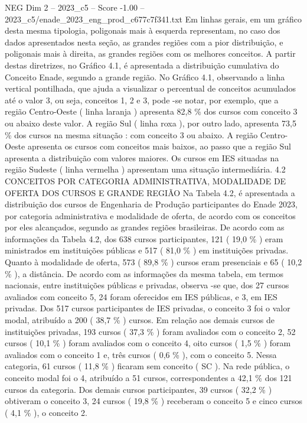 \begin{textsample}{NEG Dim 2 – 2023\_c5 – Score -1.00 – 2023\_c5/enade\_2023\_eng\_prod\_c677c7f341.txt}
Em linhas gerais, em um gráfico desta mesma tipologia, poligonais mais à esquerda representam, no caso dos dados apresentados nesta seção, as grandes regiões com a pior distribuição, e poligonais mais à direita, as grandes regiões com os melhores conceitos.
A partir destas diretrizes, no Gráfico 4.1, é apresentada a distribuição cumulativa do Conceito Enade, segundo a grande região.
No Gráfico 4.1, observando a linha vertical pontilhada, que ajuda a visualizar o percentual de conceitos acumulados até o valor 3, ou seja, conceitos 1, 2 e 3, pode -se notar, por exemplo, que a região Centro-Oeste ( linha laranja ) apresenta 82,8 \% dos cursos com conceito 3 ou abaixo deste valor.
A região Sul ( linha roxa ), por outro lado, apresenta 73,5 \% dos cursos na mesma situação : com conceito 3 ou abaixo.
A região Centro-Oeste apresenta os cursos com conceitos mais baixos, ao passo que a região Sul apresenta a distribuição com valores maiores.
Os cursos em IES situadas na região Sudeste ( linha vermelha ) apresentam uma situação intermediária. 4.2 CONCEITOS POR CATEGORIA ADMINISTRATIVA, MODALIDADE DE OFERTA DOS CURSOS E GRANDE REGIÃO Na Tabela 4.2, é apresentada a distribuição dos cursos de Engenharia de Produção participantes do Enade 2023, por categoria administrativa e modalidade de oferta, de acordo com os conceitos por eles alcançados, segundo as grandes regiões brasileiras.
De acordo com as informações da Tabela 4.2, dos 638 cursos participantes, 121 ( 19,0 \% ) eram ministrados em instituições públicas e 517 ( 81,0 \% ) em instituições privadas.
Quanto à modalidade de oferta, 573 ( 89,8 \% ) cursos eram presenciais e 65 ( 10,2 \% ), a distância.
De acordo com as informações da mesma tabela, em termos nacionais, entre instituições públicas e privadas, observa -se que, dos 27 cursos avaliados com conceito 5, 24 foram oferecidos em IES públicas, e 3, em IES privadas.
Dos 517 cursos participantes de IES privadas, o conceito 3 foi o valor modal, atribuído a 200 ( 38,7 \% ) cursos.
Em relação aos demais cursos de instituições privadas, 193 cursos ( 37,3 \% ) foram avaliados com o conceito 2, 52 cursos ( 10,1 \% ) foram avaliados com o conceito 4, oito cursos ( 1,5 \% ) foram avaliados com o conceito 1 e, três cursos ( 0,6 \% ), com o conceito 5.
Nessa categoria, 61 cursos ( 11,8 \% ) ficaram sem conceito ( SC ).
Na rede pública, o conceito modal foi o 4, atribuído a 51 cursos, correspondentes a 42,1 \% dos 121 cursos da categoria.
Dos demais cursos participantes, 39 cursos ( 32,2 \% ) obtiveram o conceito 3, 24 cursos ( 19,8 \% ) receberam o conceito 5 e cinco cursos ( 4,1 \% ), o conceito 2.

\end{textsample}
